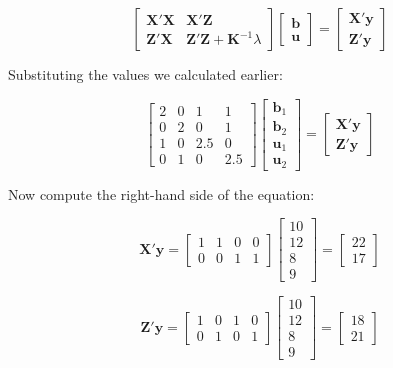 \documentclass[12pt,a4paper]{article}
\begin{document}
\[
\begin{bmatrix}
    \mathbf{X'X} & \mathbf{X'Z} \\
    \mathbf{Z'X} & \mathbf{Z'Z} + \mathbf{K}^{-1} \lambda
\end{bmatrix}
\begin{bmatrix}
    \mathbf{b} \\
    \mathbf{u}
\end{bmatrix}
=
\begin{bmatrix}
    \mathbf{X'y} \\
    \mathbf{Z'y}
\end{bmatrix}
\]

Substituting the values we calculated earlier:

\[
\begin{bmatrix}
    2 & 0 & 1 & 1 \\
    0 & 2 & 0 & 1 \\
    1 & 0 & 2.5 & 0 \\
    0 & 1 & 0 & 2.5
\end{bmatrix}
\begin{bmatrix}
    \mathbf{b}_1 \\
    \mathbf{b}_2 \\
    \mathbf{u}_1 \\
    \mathbf{u}_2
\end{bmatrix}
=
\begin{bmatrix}
    \mathbf{X'y} \\
    \mathbf{Z'y}
\end{bmatrix}
\]

Now compute the right-hand side of the equation:

\[
\mathbf{X'y} = 
\begin{bmatrix}
    1 & 1 & 0 & 0 \\
    0 & 0 & 1 & 1
\end{bmatrix}
\begin{bmatrix}
    10 \\
    12 \\
    8 \\
    9
\end{bmatrix}
=
\begin{bmatrix}
    22 \\
    17
\end{bmatrix}
\]

\[
\mathbf{Z'y} = 
\begin{bmatrix}
    1 & 0 & 1 & 0 \\
    0 & 1 & 0 & 1
\end{bmatrix}
\begin{bmatrix}
    10 \\
    12 \\
    8 \\
    9
\end{bmatrix}
=
\begin{bmatrix}
    18 \\
    21
\end{bmatrix}
\]
\end{document}
